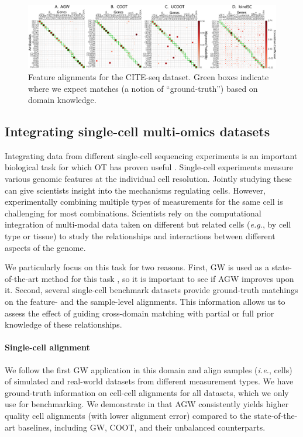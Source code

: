 \begin{figure}[t]
\centering
\includegraphics[width=\linewidth]{./Chapitre5/fig/cite_fgcoot_final.pdf}
\caption{\label{fig:cite} Feature alignments for the CITE-seq dataset. Green boxes indicate
where we expect matches (a notion of ``ground-truth'') based on domain knowledge.}
\end{figure}

\subsection{Integrating single-cell multi-omics datasets}
Integrating data from different single-cell sequencing experiments is
an important biological task for which OT has proven useful \citep{Pamona,UniPort,Demetci20}.
Single-cell experiments measure various genomic features at the individual cell resolution.
Jointly studying these can give scientists insight into the mechanisms regulating cells.
However, experimentally combining multiple types of measurements for the same cell
is challenging for most combinations. Scientists rely on the computational integration
of multi-modal data taken on different but related cells (\textit{e.g.}, by cell type or tissue)
to study the relationships and interactions between different aspects of the genome.

We particularly focus on this task for two reasons. First, GW is used as a state-of-the-art
method for this task \citep{Pamona,Demetci22,UniPort}, so it is important to see if
AGW improves upon it. Second, several single-cell benchmark datasets provide
ground-truth matchings on the feature- and the sample-level alignments.
This information allows us to assess the effect of guiding cross-domain matching with partial
or full prior knowledge of these relationships.

\paragraph{Single-cell alignment} We follow the first GW application in this domain
\citep{Demetci20} and align samples (\textit{i.e.}, cells) of simulated and real-world datasets
from different measurement types. We have ground-truth information on cell-cell alignments
for all datasets, which we only use for benchmarking. We demonstrate in 
that AGW consistently yields higher quality cell alignments (with lower alignment error)
compared to the state-of-the-art baselines, including GW, COOT, and their unbalanced counterparts.

